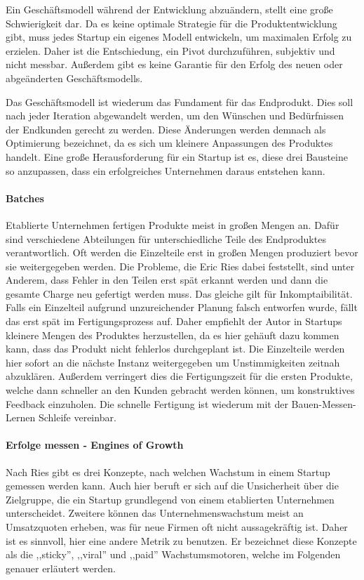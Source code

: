 Ein Geschäftsmodell während der Entwicklung abzuändern, stellt eine große Schwierigkeit dar. Da es keine optimale Strategie für die Produktentwicklung gibt, muss jedes Startup ein eigenes Modell entwickeln, um maximalen Erfolg zu erzielen. Daher ist die Entschiedung, ein Pivot durchzuführen, subjektiv und nicht messbar. Außerdem gibt es keine Garantie für den Erfolg des neuen oder abgeänderten Geschäftsmodells. 

Das Geschäftsmodell ist wiederum das Fundament für das Endprodukt. Dies soll nach jeder Iteration abgewandelt werden, um den Wünschen und Bedürfnissen der Endkunden gerecht zu werden. Diese Änderungen werden demnach als Optimierung bezeichnet, da es sich um kleinere Anpassungen des Produktes handelt. Eine große Herausforderung für ein Startup ist es, diese drei Bausteine so anzupassen, dass ein erfolgreiches Unternehmen daraus entstehen kann.

\paragraph{Batches}
Etablierte Unternehmen fertigen Produkte meist in großen Mengen an. Dafür sind verschiedene Abteilungen für unterschiedliche Teile des Endproduktes verantwortlich. Oft werden die Einzelteile erst in großen Mengen produziert bevor sie weitergegeben werden. Die Probleme, die Eric Ries dabei feststellt, sind unter Anderem, dass Fehler in den Teilen erst spät erkannt werden und dann die gesamte Charge neu gefertigt werden muss. Das gleiche gilt für Inkomptaibilität. Falls ein Einzelteil aufgrund unzureichender Planung falsch entworfen wurde, fällt das erst spät im Fertigungsprozess auf. Daher empfiehlt der Autor in Startups kleinere Mengen des Produktes herzustellen, da es hier gehäuft dazu kommen kann, dass das Produkt nicht fehlerlos durchgeplant ist. Die Einzelteile werden hier sofort an die nächste Instanz weitergegeben um Unstimmigkeiten zeitnah abzuklären. Außerdem verringert dies die Fertigungszeit für die ersten Produkte, welche dann schneller an den Kunden gebracht werden können, um konstruktives Feedback einzuholen. Die schnelle Fertigung ist wiederum mit der Bauen-Messen-Lernen Schleife vereinbar.

\paragraph{Erfolge messen - Engines of Growth}
Nach Ries gibt es drei Konzepte, nach welchen Wachstum in einem Startup gemessen werden kann. Auch hier beruft er sich auf die Unsicherheit über die Zielgruppe, die ein Startup grundlegend von einem etablierten Unternehmen unterscheidet. Zweitere können das Unternehmenswachstum meist an Umsatzquoten erheben, was für neue Firmen oft nicht aussagekräftig ist. Daher ist es sinnvoll, hier eine andere Metrik zu benutzen. Er bezeichnet diese Konzepte als die ,,sticky'', ,,viral'' und ,,paid'' Wachstumsmotoren, welche im Folgenden genauer erläutert werden.

